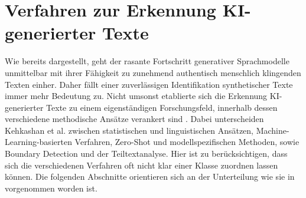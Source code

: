 \section{Verfahren zur Erkennung KI-generierter Texte}
Wie bereits dargestellt, geht der rasante Fortschritt generativer Sprachmodelle unmittelbar mit ihrer Fähigkeit zu zunehmend authentisch menschlich klingenden Texten einher. Daher fällt einer zuverlässigen Identifikation synthetischer Texte immer mehr Bedeutung zu. Nicht umsonst etablierte sich die Erkennung KI-generierter Texte zu einem eigenständigen Forschungsfeld, innerhalb dessen verschiedene methodische Ansätze verankert sind \autocite{kehkashan2025}. Dabei unterscheiden Kehkashan et al. \autocite{kehkashan2025} zwischen statistischen und linguistischen Ansätzen, Machine-Learning-basierten Verfahren, Zero-Shot und modellspezifischen Methoden, sowie Boundary Detection und der Teiltextanalyse. Hier ist zu berücksichtigen, dass sich die verschiedenen Verfahren oft nicht klar einer Klasse zuordnen lassen können. Die folgenden Abschnitte orientieren sich an der Unterteilung wie sie in \autocite{kehkashan2025} vorgenommen worden ist.

